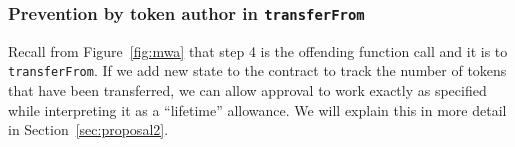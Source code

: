 
	
\subsubsection*{Prevention by token author in \texttt{transferFrom}} Recall from Figure~\ref{fig:mwa} that step 4 is the offending function call and it is to \texttt{transferFrom}. If we add new state to the contract to track the number of tokens that have been transferred, we can allow approval to work exactly as specified while interpreting it as a ``lifetime'' allowance. We will explain this in more detail in Section~\ref{sec:proposal2}. 


